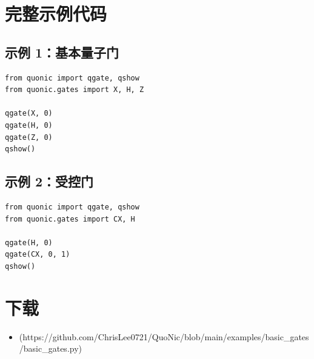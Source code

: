 \documentclass[12pt,a4paper]{article}
\begin{document}
\section{完整示例代码}

\subsection{示例 1：基本量子门}

\begin{verbatim}
from quonic import qgate, qshow
from quonic.gates import X, H, Z

qgate(X, 0)
qgate(H, 0)
qgate(Z, 0)
qshow()
\end{verbatim}

\subsection{示例 2：受控门}

\begin{verbatim}
from quonic import qgate, qshow
from quonic.gates import CX, H

qgate(H, 0)
qgate(CX, 0, 1)
qshow()
\end{verbatim}

\section{下载}

\begin{itemize}
  \item [basic\_gates.py](https://github.com/ChrisLee0721/QuoNic/blob/main/examples/basic_gates/basic_gates.py)
\end{itemize}
\end{document}
